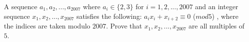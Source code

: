 A sequence $a_1,a_2,...,a_{2007}$ where $a_i \in\{2,3\}$ for $i = 1,2,...,2007$ and an integer sequence $x_1,x_2,...,x_{2007}$ satisfies the following: $a_ix_i + x_{i+2 }\equiv 0$ ($mod 5$) , where the indices are taken modulo $2007$. Prove that $x_1,x_2,...,x_{2007}$ are all multiples of $5$.